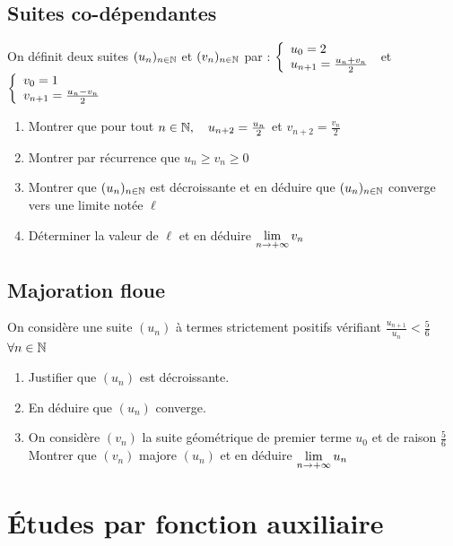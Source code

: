 \documentclass[oneside,12pt]{book}          %
\begin{document}
\subsection{Suites co-dépendantes}
On définit deux suites ${(u_{n})_{n\in\mathbb N}}$ et $(v_n)_{{n\in\mathbb N}}$ par : $\accolsized{u_0=2\\u_{n+1}=\frac{u_n+v_n}{2}}{1} $ et $\accolsized{v_0=1\\v_{n+1}=\frac{u_n-v_n}{2}}{1} $
\begin{enumerate}
    \item Montrer que pour tout ${n\in\mathbb N},\quad u_{n+2}=\frac{u_n}{2}$ et $v_{n+2}=\frac{v_n}{2}$
    \item Montrer par récurrence que $u_n\geq v_n\geq0$
    \item Montrer que ${(u_{n})_{n\in\mathbb N}}$ est décroissante et en déduire que ${(u_{n})_{n\in\mathbb N}}$ converge vers une limite notée $\ell$
    \item Déterminer la valeur de $\ell$ et en déduire ${\lim\limits_{n\to +\infty}}\, v_n$
\end{enumerate}



\subsection{Majoration floue}
On considère une suite $(u_n)$ à termes strictement positifs vérifiant $\frac{u_{n+1}}{u_n}<\frac{5}{6}$ \quad $\forall{n\in\mathbb N}$
\begin{enumerate}
	\item Justifier que $(u_n)$ est décroissante.
	\item En déduire que $(u_n)$ converge.
	\item On considère $(v_n)$ la suite géométrique de premier terme $u_0$ et de raison $\frac{5}{6}$\\
	Montrer que $(v_n)$ majore $(u_n)$ et en déduire ${\lim\limits_{n\to +\infty}}\, u_n$
\end{enumerate}



\section{Études par fonction auxiliaire}
\end{document}
